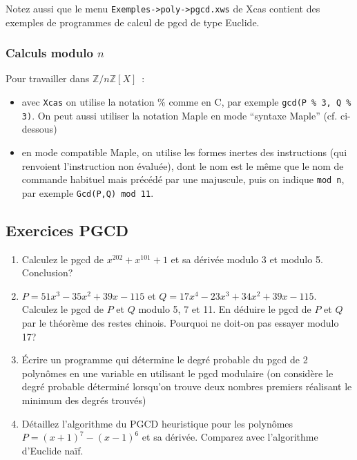 \documentclass[a4paper,11pt]{article}
\newcommand{\Z}{{\mathbb{Z}}}
\begin{document}
\begin{giacjshere}
Notez aussi que le menu \verb|Exemples->poly->pgcd.xws| de Xcas contient 
des exemples de programmes de calcul de pgcd de type Euclide.

\subsubsection{Calculs modulo $n$}
Pour travailler dans $\Z/n\Z[X]$~:
\begin{itemize}
\item avec \verb|Xcas| on utilise la notation \% comme en C, par
exemple {\tt gcd(P \% 3, Q \% 3)}. On peut aussi utiliser la notation
Maple en mode ``syntaxe Maple'' (cf. ci-dessous)
\item en mode compatible Maple,
on utilise les formes inertes des instructions (qui renvoient l'instruction
non \'evalu\'ee), dont le nom est le m\^eme que le nom de commande
habituel mais pr\'ec\'ed\'e par une majuscule, puis on indique
\verb|mod n|, par exemple \verb|Gcd(P,Q) mod 11|.
\end{itemize}

\pagebreak

\subsection{Exercices PGCD}
\begin{enumerate}

\item Calculez le pgcd de $x^{202}+x^{101}+1$
et sa dérivée modulo 3 et modulo 5. Conclusion?

\item $P=51x^3-35x^2+39x-115$ et $Q=17x^4-23x^3+34x^2+39x-115$.
Calculez le pgcd de $P$ et $Q$ modulo 5, 7 et 11. En déduire
le pgcd de $P$ et $Q$ par le théorème des restes chinois. Pourquoi
ne doit-on pas essayer modulo 17?

\item \'Ecrire un programme qui d\'etermine le degr\'e probable
du pgcd de 2 polyn\^omes en une variable en utilisant le pgcd modulaire 
(on consid\`ere le degr\'e probable d\'etermin\'e lorsqu'on trouve
deux nombres premiers r\'ealisant le minimum des degr\'es trouv\'es)

\item Détaillez l'algorithme du PGCD heuristique pour les
polynômes  $P=(x+1)^7-(x-1)^6$ et sa dérivée. Comparez avec l'algorithme
d'Euclide naïf.


\end{enumerate}
\end{giacjshere}
\end{document}
